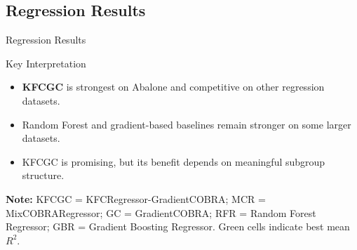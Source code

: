 \subsection{Regression Results}
\begin{frame}[t]{Regression Results}
\scriptsize
\begin{table}
\centering
\renewcommand{\arraystretch}{1.22}
\setlength{\tabcolsep}{5pt}
\end{table}

\vspace{0.12cm}
\begin{block}{Key Interpretation}
\begin{itemize}\setlength\itemsep{0.06cm}
    \item \textbf{KFCGC} is strongest on Abalone and competitive on other regression datasets.
    \item Random Forest and gradient-based baselines remain stronger on some larger datasets.
    \item KFCGC is promising, but its benefit depends on meaningful subgroup structure.
\end{itemize}
\end{block}

{\scriptsize \textbf{Note:} KFCGC = KFCRegressor-GradientCOBRA; MCR = MixCOBRARegressor; GC = GradientCOBRA; RFR = Random Forest Regressor; GBR = Gradient Boosting Regressor. Green cells indicate best mean $R^2$.}
\end{frame}
